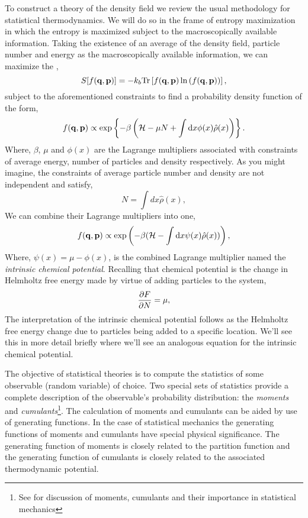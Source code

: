 To construct a theory of the density field we review the usual methodology for
statistical thermodynamics. We will do so in the frame of entropy maximization
in which the entropy is maximized subject to the macroscopically available
information. Taking the existence of an average of the density field, particle
number and energy as the macroscopically available information, we can maximize
the ,
%
\begin{equation}
    S[f(\mathbf{q}, \mathbf{p})] = -k_b \mathrm{Tr}\left[ f(\mathbf{q}, \mathbf{p})\ln\left(f(\mathbf{q}, \mathbf{p})\right) \right], 
\end{equation}
%
subject to the aforementioned constraints  to find a probability density function
of the form,
%
\begin{equation} 
    f(\mathbf{q}, \mathbf{p}) \propto \exp\left\lbrace-\beta \left(\mathcal{H} -\mu N + \int \mathrm{d}x
        \phi(x)\hat{\rho}(x)\right)\right\rbrace.
\end{equation}
%
Where, $\beta$, $\mu$ and $\phi(x)$ are the Lagrange multipliers associated
with constraints of average energy, number of particles and density
respectively. As you might imagine, the constraints of average particle number
and density are not independent and satisfy,
%
\begin{equation}
    N = \int dx \hat{\rho}(x),
\end{equation}
%
We can combine their Lagrange multipliers into one,
%
\begin{equation}
    f(\mathbf{q}, \mathbf{p}) \propto \exp\left(- \beta(\mathcal{H} - \int \mathrm{d}x \psi(x)
        \hat{\rho}(x))\right),
\end{equation}
%
Where, $\psi(x) = \mu - \phi(x)$, is the combined Lagrange multiplier named
the \textit{intrinsic chemical potential}. Recalling that chemical potential is
the change in Helmholtz free energy made by virtue of adding particles to the
system,
%
\begin{equation}
    \label{eq:chem_potential} 
    \frac{\partial F}{\partial N} = \mu,
\end{equation}
%
The interpretation of the intrinsic chemical potential follows as the Helmholtz
free energy change due to particles being added to a specific location.  We'll
see this in more detail briefly where we'll see an analogous equation for the
intrinsic chemical potential.

The objective of statistical theories is to compute the statistics of some
observable (random variable) of choice. Two special sets of statistics provide
a complete description of the observable's probability distribution: the
\textit{moments} and \textit{cumulants}\footnote{See \cite{KUBO62} for
discussion of moments, cumulants and their importance in statistical
mechanics}.  The calculation of moments and cumulants can be aided by use of
generating functions. In the case of statistical mechanics the generating
functions of moments and cumulants have special physical significance. The
generating function of moments is closely related to the partition function and
the generating function of cumulants is closely related to the associated
thermodynamic potential. 

